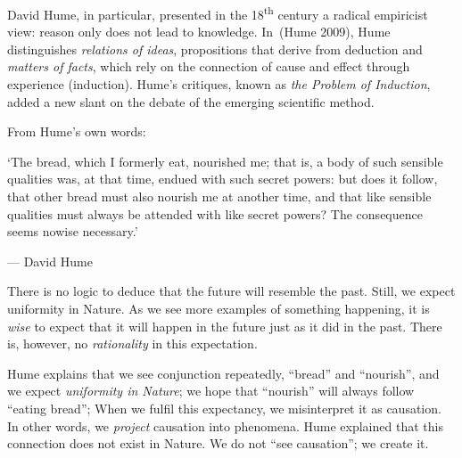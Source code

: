 \documentclass[
  letterpaper,
  12pt,
  british]{tufte-book}
\renewenvironment{quote}{
  \list{}{\leftmargin=3.5cm\topsep=0pt}
  \item\relax\small\itshape
}
{\endlist}
\theoremstyle{plain}
\theoremstyle{definition}
\theoremstyle{plain}
\theoremstyle{remark}
\begin{document}
David Hume, in particular, presented in the 18\textsuperscript{th}
century a radical empiricist view: reason only does not lead to
knowledge. In~(Hume
2009),
Hume distinguishes \emph{relations of ideas}, propositions that derive
from deduction and \emph{matters of facts}, which rely on the connection
of cause and effect through experience (induction). Hume's critiques,
known as \emph{the Problem of Induction}, added a new slant on the
debate of the emerging scientific method.

From Hume's own words:

\begin{quote}
`The bread, which I formerly eat, nourished me; that is, a body of such
sensible qualities was, at that time, endued with such secret powers:
but does it follow, that other bread must also nourish me at another
time, and that like sensible qualities must always be attended with like
secret powers? The consequence seems nowise necessary.'

--- David Hume
\end{quote}

There is no logic to deduce that the future will resemble the past.
Still, we expect uniformity in Nature. As we see more examples of
something happening, it is \emph{wise} to expect that it will happen in
the future just as it did in the past. There is, however, no
\emph{rationality} in this
expectation.

Hume explains that we see conjunction repeatedly, ``bread'' and
``nourish'', and we expect \emph{uniformity in Nature}; we hope that
``nourish'' will always follow ``eating bread''; When we fulfil this
expectancy, we misinterpret it as causation. In other words, we
\emph{project} causation into phenomena. Hume explained that this
connection does not exist in Nature. We do not ``see causation''; we
create it.
\end{document}
